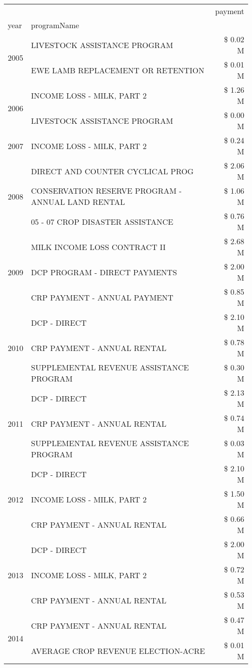 \begin{tabular}{llr}
\toprule
 &  & payment \\
year & programName &  \\
\midrule
\multirow[t]{2}{*}{2005} & LIVESTOCK ASSISTANCE PROGRAM & \$ 0.02 M \\
 & EWE LAMB REPLACEMENT OR RETENTION & \$ 0.01 M \\
\cline{1-3}
\multirow[t]{2}{*}{2006} & INCOME LOSS - MILK, PART 2 & \$ 1.26 M \\
 & LIVESTOCK ASSISTANCE PROGRAM & \$ 0.00 M \\
\cline{1-3}
2007 & INCOME LOSS - MILK, PART 2 & \$ 0.24 M \\
\cline{1-3}
\multirow[t]{3}{*}{2008} & DIRECT AND COUNTER CYCLICAL PROG & \$ 2.06 M \\
 & CONSERVATION RESERVE PROGRAM - ANNUAL LAND RENTAL & \$ 1.06 M \\
 & 05 - 07 CROP DISASTER ASSISTANCE & \$ 0.76 M \\
\cline{1-3}
\multirow[t]{3}{*}{2009} & MILK INCOME LOSS CONTRACT II & \$ 2.68 M \\
 & DCP PROGRAM - DIRECT PAYMENTS & \$ 2.00 M \\
 & CRP PAYMENT - ANNUAL PAYMENT & \$ 0.85 M \\
\cline{1-3}
\multirow[t]{3}{*}{2010} & DCP - DIRECT & \$ 2.10 M \\
 & CRP PAYMENT - ANNUAL RENTAL & \$ 0.78 M \\
 & SUPPLEMENTAL REVENUE ASSISTANCE PROGRAM & \$ 0.30 M \\
\cline{1-3}
\multirow[t]{3}{*}{2011} & DCP - DIRECT & \$ 2.13 M \\
 & CRP PAYMENT - ANNUAL RENTAL & \$ 0.74 M \\
 & SUPPLEMENTAL REVENUE ASSISTANCE PROGRAM & \$ 0.03 M \\
\cline{1-3}
\multirow[t]{3}{*}{2012} & DCP - DIRECT & \$ 2.10 M \\
 & INCOME LOSS - MILK, PART 2 & \$ 1.50 M \\
 & CRP PAYMENT - ANNUAL RENTAL & \$ 0.66 M \\
\cline{1-3}
\multirow[t]{3}{*}{2013} & DCP - DIRECT & \$ 2.00 M \\
 & INCOME LOSS - MILK, PART 2 & \$ 0.72 M \\
 & CRP PAYMENT - ANNUAL RENTAL & \$ 0.53 M \\
\cline{1-3}
\multirow[t]{3}{*}{2014} & CRP PAYMENT - ANNUAL RENTAL & \$ 0.47 M \\
 & AVERAGE CROP REVENUE ELECTION-ACRE & \$ 0.01 M \\

\end{tabular}
